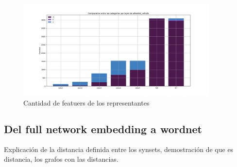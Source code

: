\documentclass[12,twoside]{TFG-GM}
\theoremstyle{definition}
\theoremstyle{remark}
\begin{document}
\begin{figure}[ht] 
	\centering
	\includegraphics[width=0.9\textwidth] {Images/plots/25/synsetslayer/Comparative_of_synsets_wheeled_vehicle.png}
	\caption{ Cantidad de featuers de los representantes
	\label{fig:representantes}}
\end{figure}


\subsection{Del full network embedding a wordnet}

Explicación de la distancia definida entre los synsets, demostración de que es distancia, los grafos con las distancias. 



\end{document}
